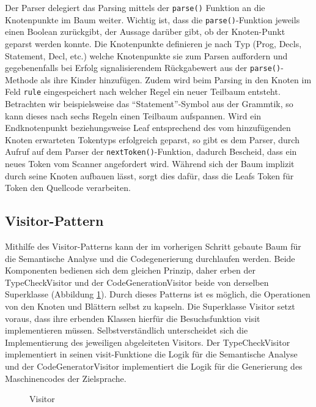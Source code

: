 \documentclass[a4paper,11pt]{report}
\begin{document}
Der Parser delegiert das Parsing mittels der \texttt{parse()} Funktion an die Knotenpunkte im Baum weiter.
Wichtig ist, dass die \texttt{parse()}-Funktion jeweils einen Boolean zurückgibt, der Aussage darüber gibt, ob der Knoten-Punkt geparst werden konnte.
Die Knotenpunkte definieren je nach Typ (Prog, Decls, Statement, Decl, etc.) welche Knotenpunkte sie zum Parsen auffordern und gegebenenfalls bei Erfolg signalisierendem Rückgabewert aus der \texttt{parse()}-Methode als ihre Kinder hinzufügen.
Zudem wird beim Parsing in den Knoten im Feld \texttt{rule} eingespeichert nach welcher Regel ein neuer Teilbaum entsteht.
Betrachten wir beispielsweise das "`Statement"'-Symbol aus der Grammtik, so kann dieses nach sechs Regeln einen Teilbaum aufspannen.
Wird ein Endknotenpunkt beziehungsweise Leaf entsprechend des vom hinzufügenden Knoten erwarteten Tokentyps erfolgreich geparst, so gibt es dem Parser, durch Aufruf auf dem Parser der \texttt{nextToken()}-Funktion, dadurch Bescheid, dass ein neues Token vom Scanner angefordert wird.
Während sich der Baum implizit durch seine Knoten aufbauen lässt, sorgt dies dafür, dass die Leafs Token für Token den Quellcode verarbeiten.

\subsection{Visitor-Pattern}
Mithilfe des Visitor-Patterns kann der im vorherigen Schritt gebaute Baum für die Semantische Analyse und die Codegenerierung durchlaufen werden.
Beide Komponenten bedienen sich dem gleichen Prinzip, daher erben der TypeCheckVisitor und der CodeGenerationVisitor beide von derselben Superklasse (Abbildung \ref{fig:visitor}).
Durch dieses Patterns ist es möglich, die Operationen von den Knoten und Blättern selbst zu kapseln.
Die Superklasse Visitor setzt voraus, dass ihre erbenden Klassen hierfür die Besuchsfunktion visit implementieren müssen.
Selbstverständlich unterscheidet sich die Implementierung des jeweiligen abgeleiteten Visitors.
Der TypeCheckVisitor implementiert in seinen visit-Funktione die Logik für die Semantische Analyse und der CodeGeneratorVisitor implementiert die Logik für die Generierung des Maschinencodes der Zielsprache.

\begin{figure}
\centering
{}
\caption{Visitor}
\label{fig:visitor}
\end{figure}
\end{document}
